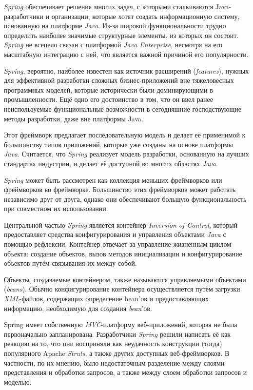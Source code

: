 \textit{Spring} обеспечивает решения многих задач, с которыми сталкиваются Java-разработчики и организации, которые хотят создать информационную систему, основанную на платформе \textit{Java}. Из-за широкой функциональности трудно определить наиболее значимые структурные элементы, из которых он состоит. \textit{Spring} не всецело связан с платформой \textit{Java Enterprise}, несмотря на его масштабную интеграцию с ней, что является важной причиной его популярности.

\textit{Spring}, вероятно, наиболее известен как источник расширений (\textit{features}), нужных для эффективной разработки сложных бизнес-приложений вне тяжеловесных программных моделей, которые исторически были доминирующими в промышленности. Ещё одно его достоинство в том, что он ввел ранее неиспользуемые функциональные возможности в сегодняшние господствующие методы разработки, даже вне платформы Java.

Этот фреймворк предлагает последовательную модель и делает её применимой к большинству типов приложений, которые уже созданы на основе платформы \textit{Java}. Считается, что \textit{Spring} реализует модель разработки, основанную на лучших стандартах индустрии, и делает её доступной во многих областях \textit{Java}.

\textit{Spring} может быть рассмотрен как коллекция меньших фреймворков или фреймворков во фреймворке. Большинство этих фреймворков может работать независимо друг от друга, однако они обеспечивают большую функциональность при совместном их использовании.

Центральной частью \textit{Spring} является контейнер \textit{Inversion of Control}, который предоставляет средства конфигурирования и управления объектами \textit{Java} с помощью рефлексии. Контейнер отвечает за управление жизненным циклом объекта: создание объектов, вызов методов инициализации и конфигурирование объектов путём связывания их между собой.

Объекты, создаваемые контейнером, также называются управляемыми объектами (\textit{beans}). Обычно конфигурирование контейнера осуществляется путём загрузки \textit{XML}-файлов, содержащих определение bean’ов и предоставляющих информацию, необходимую для создания \textit{bean}’ов.

Spring имеет собственную \textit{MVC}-платформу веб-приложений, которая не была первоначально запланирована. Разработчики \textit{Spring} решили написать её как реакцию на то, что они восприняли как неудачность конструкции (тогда) популярного Apache \textit{Struts}, а также других доступных веб-фреймворков. В частности, по их мнению, было недостаточным разделение между слоями представления и обработки запросов, а также между слоем обработки запросов и моделью.

